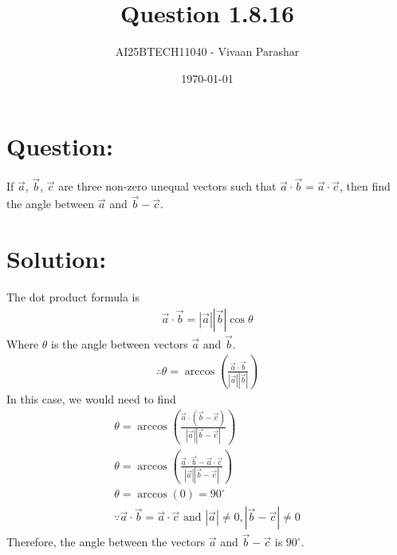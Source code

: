 \documentclass[a4paper, 12pt]{article}
\title{Question 1.8.16}
\author{AI25BTECH11040 - Vivaan Parashar}
\date{\today}
\begin{document}
\maketitle

\section{Question: }
If $\vec{a}$, $\vec{b}$, $\vec{c}$ are three non-zero unequal vectors such that $\vec{a}\cdot\vec{b} = \vec{a}\cdot\vec{c}$, then find the angle between $\vec{a}$ and $\vec{b}-\vec{c}$.

\section{Solution: }
The dot product formula is
\begin{align}
    \vec{a}\cdot\vec{b} = |\vec{a}||\vec{b}|\cos\theta
\end{align} Where $\theta$ is the angle between vectors $\vec{a}$ and $\vec{b}$.
\begin{align}
    \therefore\theta = \arccos(\frac{\vec{a}\cdot\vec{b}}{|\vec{a}||\vec{b}|})
\end{align}
In this case, we would need to find
\begin{align}
    \theta = \arccos(\frac{\vec{a}\cdot(\vec{b}-\vec{c})}{|\vec{a}||\vec{b}-\vec{c}|})\\
    \theta = \arccos(\frac{\vec{a}\cdot\vec{b}-\vec{a}\cdot\vec{c}}{|\vec{a}||\vec{b}-\vec{c}|})\\
    \theta = \arccos(0) = 90^\circ\\
    \because \vec{a}\cdot\vec{b}=\vec{a}\cdot\vec{c} \text{ and } |\vec{a}| \ne 0, |\vec{b}-\vec{c}| \ne 0
\end{align}
Therefore, the angle between the vectors $\vec{a}$ and $\vec{b}-\vec{c}$ is $90^\circ$.
\end{document}
